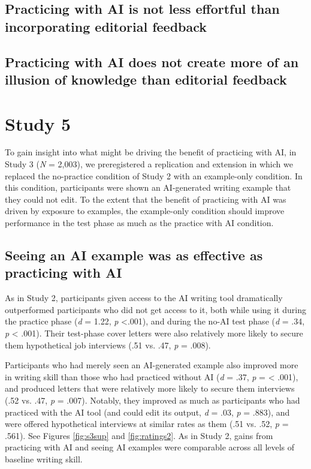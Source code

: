 \documentclass[11pt]{report}
\begin{document}
\begin{mainf}
\subsection{Practicing with AI is not less effortful than incorporating editorial feedback}

\subsection{Practicing with AI does not create more of an illusion of knowledge than editorial feedback}


\section{Study 5} 

To gain insight into what might be driving the benefit of practicing with AI, in Study 3 (\emph{N} = 2,003), we preregistered a replication and extension in which we replaced the no-practice condition of Study 2 with an example-only condition.
In this condition, participants were shown an AI-generated writing example that they could not edit. 
To the extent that the benefit of practicing with AI was driven by exposure to examples, the example-only condition should improve performance in the test phase as much as the practice with AI condition.

\subsection{Seeing an AI example was as effective as practicing with
AI}\label{seeing-an-ai-example-was-as-effective-as-practicing-with-ai}

As in Study 2, participants given access to the AI writing tool dramatically outperformed participants who did not get access to it, both while using it during the practice phase (\emph{d} = 1.22, \emph{p} \textless.001), and during the no-AI test phase (\emph{d} = .34, \emph{p}  \textless{} .001). Their test-phase cover letters were also relatively more likely to secure them hypothetical job interviews (.51 vs. .47, \textit{p} = .008).

Participants who had merely seen an AI-generated example also improved more in writing skill than those who had practiced without AI (\emph{d} = .37, \emph{p} = \textless{} .001), and produced letters that were relatively more likely to secure them interviews (.52 vs. .47, \textit{p} = .007). Notably, they improved as much as participants who had practiced with the AI tool (and could edit its output, \emph{d} = .03, \emph{p} = .883), and were offered hypothetical interviews at similar rates as them (.51 vs. .52, \textit{p} = .561). See Figures \ref{fig:s3sup} and \ref{fig:ratings2}. As in Study 2, gains from practicing with AI and seeing AI examples were comparable across all levels of baseline writing skill.


\end{mainf}
\end{document}
